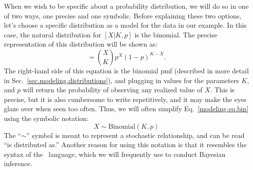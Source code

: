 When
we wish to be specific about a probability distribution, we will do
so in one of two ways, one precise and one symbolic. Before explaining
these two options, let's choose a specific distribution as a model for
the data in our example. In this case, the natural distribution for
$[X|K,p]$ is the binomial. The precise representation of this
distribution will be shown as:
\begin{equation}
  [X|K,p] = %
             \binom{X}{K}p^X(1-p)^{K-X}.
  \label{modeling.eq.bin}
\end{equation}
The right-hand side of this equation is the binomial pmf (described in
more detail in Sec.~\ref{sec.modeling.distributions}), and plugging in
values for the parameters $K$, and $p$ will return the probability of
observing any realized value of $X$. This is precise, but it is also
cumbersome to write repetitively, and it may make the eyes glaze over
when seen too often. Thus, we will
often simplify Eq.~\ref{modeling.eq.bin} using the symbolic notation:
\begin{equation}
  X \sim \text{Binomial}(K, p)
  \label{modeling.eq.binsym}
\end{equation}
The ``$\sim$'' symbol is meant to represent a stochastic relationship, and
can be read ``is distributed as.''
Another reason for using this notation is that
it resembles the syntax of the \bugs~language, which we will
frequently use to conduct Bayesian inference.

